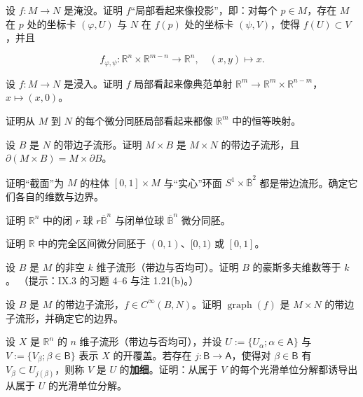 \begin{exercises}
\item

设 $ f: M \to N $ 是淹没。证明 $ f $“局部看起来像投影”，即：对每个 $ p \in M $，存在 $ M $ 在 $ p $ 处的坐标卡 $ (\varphi, U) $ 与 $ N $ 在 $ f(p) $ 处的坐标卡 $ (\psi, V) $，使得 $ f(U) \subset V $，并且

\[
f_{\varphi,\psi}: \mathbb{R}^n \times \mathbb{R}^{m-n} \to \mathbb{R}^n, \quad (x,y) \mapsto x.
\]
\item

设 $ f: M \to N $ 是浸入。证明 $ f $ 局部看起来像典范单射 $ \mathbb{R}^m \to \mathbb{R}^m \times \mathbb{R}^{n-m} $，$ x \mapsto (x,0) $。

\item

证明从 $ M $ 到 $ N $ 的每个微分同胚局部看起来都像 $ \mathbb{R}^m $ 中的恒等映射。

\item

设 $ B $ 是 $ N $ 的带边子流形。证明 $ M \times B $ 是 $ M \times N $ 的带边子流形，且 $ \partial(M \times B) = M \times \partial B $。

\item

证明“截面”为 $ M $ 的柱体 $ [0,1] \times M $ 与“实心”环面 $ S^1 \times \overline{\mathbb{B}}^2 $ 都是带边流形。确定它们各自的维数与边界。

\item

证明 $ \mathbb{R}^n $ 中的闭 $ r $ 球 $ r\overline{\mathbb{B}}^n $ 与闭单位球 $ \overline{\mathbb{B}}^n $ 微分同胚。

\item

证明 $ \mathbb{R} $ 中的完全区间微分同胚于 $ (0,1) $、$ [0,1) $ 或 $ [0,1] $。

\item

设 $ B $ 是 $ M $ 的非空 $ k $ 维子流形（带边与否均可）。证明 $ B $ 的豪斯多夫维数等于 $ k $。
（提示：IX.3 的习题 4–6 与注 1.21(b)。）

\item

设 $ B $ 是 $ M $ 的带边子流形，$ f \in C^{\infty}(B, N) $。证明 $ \operatorname{graph}(f) $ 是 $ M \times N $ 的带边子流形，并确定它的边界。

\item

设 $ X $ 是 $ \mathbb{R}^n $ 的 $ n $ 维子流形（带边与否均可），并设 $ U := \{U_{\alpha}; \alpha \in \mathsf{A}\} $ 与 $ V := \{V_{\beta}; \beta \in \mathsf{B}\} $ 表示 $ X $ 的开覆盖。若存在 $ j: \mathsf{B} \to \mathsf{A} $，使得对 $ \beta \in \mathsf{B} $ 有 $ V_{\beta} \subset U_{j(\beta)} $，则称 $ V $ 是 $ U $ 的\textbf{加细}。证明：从属于 $ V $ 的每个光滑单位分解都诱导出从属于 $ U $ 的光滑单位分解。

\end{exercises}

